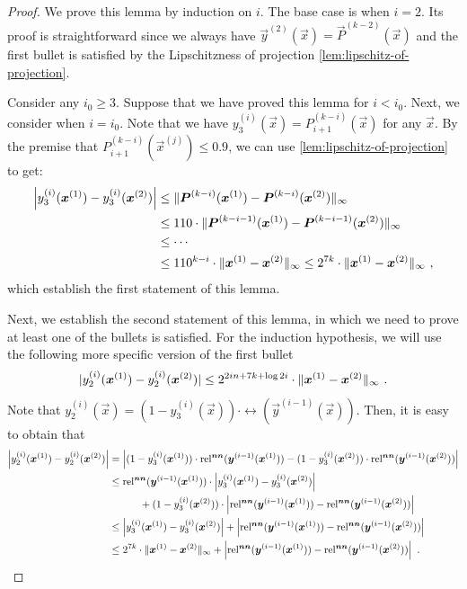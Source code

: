 \begin{proof}
    We prove this lemma by induction on $i$. The base case is when $i=2$. Its proof is straightforward since we always have $\vec{y}^{(2)}(\vec{x})=\vec{P}^{(k-2)}(\vec{x})$ and the first bullet is satisfied by the Lipschitzness of projection \cref{lem:lipschitz-of-projection}. 

    Consider any $i_0\geq 3$. 
    Suppose that we have proved this lemma for $i<i_0$. 
    Next, we consider when $i=i_0$.
    Note that we have $y_3^{(i)}(\vec{x})=P_{i+1}^{(k-i)}(\vec{x})$ for any $\vec{x}$.
    By the premise that $P_{i+1}^{(k-i)}(\vec{x}^{(j)})\leq 0.9$, we can use \cref{lem:lipschitz-of-projection} to get:
    \begin{align*}
        \left |{y_3^{(i)}(\boldsymbol{x}^{(1)})-y_3^{(i)}(\boldsymbol{x}^{(2)})} \right |
        &\leq 
        \| {\boldsymbol{P}^{(k-i)}(\boldsymbol{x}^{(1)})-\boldsymbol{P}^{(k-i)}(\boldsymbol{x}^{(2)})} \|_{\infty}
        \\
        &\leq 
        110\cdot \| {\boldsymbol{P}^{(k-i-1)}(\boldsymbol{x}^{(1)})-\boldsymbol{P}^{(k-i-1)}(\boldsymbol{x}^{(2)})} \|_{\infty}
        \\
        &\leq
        \cdots
        \\
        &\leq 
        110^{k-i}\cdot \| {\boldsymbol{x}^{(1)}-\boldsymbol{x}^{(2)}} \|_{\infty}
        \leq 2^{7k}\cdot \| {\boldsymbol{x}^{(1)}-\boldsymbol{x}^{(2)}} \|_{\infty}~,
    \end{align*}
    which establish the first statement of this lemma. 

    Next, we establish the second statement of this lemma, in which we need to prove at least one of the bullets is satisfied.
    For the induction hypothesis, we will use the following more specific version of the first bullet 
    \[
        |{y_2^{(i)}(\boldsymbol{x}^{(1)})-y_2^{(i)}(\boldsymbol{x}^{(2)})} |\leq 2^{2in+7k+\log  2i}\cdot \| {\boldsymbol{x}^{(1)}-\boldsymbol{x}^{(2)}} \|_{\infty}~.
    \]
    Note that $y_2^{(i)}(\vec{x})=(1-y_3^{(i)}(\vec{x}))\cdot \rel(\vec{y}^{(i-1)}(\vec{x}))$. 
    Then, it is easy to obtain that
    \begin{align*}
        \left |{y_2^{(i)}(\boldsymbol{x}^{(1)})-y_2^{(i)}(\boldsymbol{x}^{(2)})} \right | 
        &= 
        \left |{(1-y_3^{(i)}(\boldsymbol{x}^{(1)}))\cdot \operatorname*{rel^{\boldsymbol{nn}}}(\boldsymbol{y}^{(i-1)}(\boldsymbol{x}^{(1)})) - (1-y_3^{(i)}(\boldsymbol{x}^{(2)}))\cdot \operatorname*{rel^{\boldsymbol{nn}}}(\boldsymbol{y}^{(i-1)}(\boldsymbol{x}^{(2)}))} \right |
        \\
        &\leq
        \operatorname*{rel^{\boldsymbol{nn}}}(\boldsymbol{y}^{(i-1)}(\boldsymbol{x}^{(1)}))\cdot \left |{y_3^{(i)}(\boldsymbol{x}^{(1)})-y_3^{(i)}(\boldsymbol{x}^{(2)})} \right | 
        \\
        & \qquad \quad + (1-y_3^{(i)}(\boldsymbol{x}^{(2)})) \cdot \left |{\operatorname*{rel^{\boldsymbol{nn}}}(\boldsymbol{y}^{(i-1)}(\boldsymbol{x}^{(1)})) - \operatorname*{rel^{\boldsymbol{nn}}}(\boldsymbol{y}^{(i-1)}(\boldsymbol{x}^{(2)})) } \right |
        \\
        &\leq
        \left |{y_3^{(i)}(\boldsymbol{x}^{(1)})-y_3^{(i)}(\boldsymbol{x}^{(2)})} \right | + \left |{\operatorname*{rel^{\boldsymbol{nn}}}(\boldsymbol{y}^{(i-1)}(\boldsymbol{x}^{(1)})) - \operatorname*{rel^{\boldsymbol{nn}}}(\boldsymbol{y}^{(i-1)}(\boldsymbol{x}^{(2)})) } \right |
        \\
        &\leq 
        2^{7k}\cdot \| {\boldsymbol{x}^{(1)}-\boldsymbol{x}^{(2)}} \|_{\infty} + \left |{\operatorname*{rel^{\boldsymbol{nn}}}(\boldsymbol{y}^{(i-1)}(\boldsymbol{x}^{(1)})) - \operatorname*{rel^{\boldsymbol{nn}}}(\boldsymbol{y}^{(i-1)}(\boldsymbol{x}^{(2)})) } \right |~.
    \end{align*}


\end{proof}
